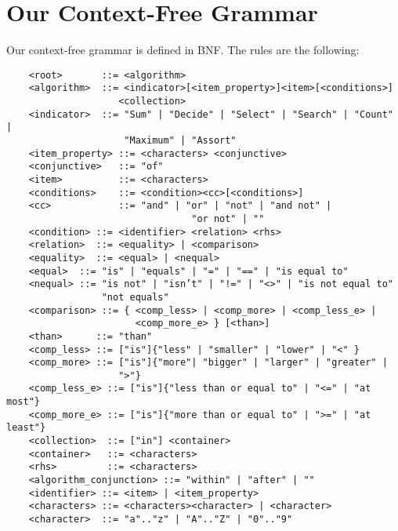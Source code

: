 \section{Our Context-Free Grammar}\label{app:bnf}

Our context-free grammar is defined in BNF. The rules are the following:
\begingroup \fontsize{9pt}{9pt}\selectfont

    \begin{verbatim}
    <root>       ::= <algorithm>
    <algorithm>  ::= <indicator>[<item_property>]<item>[<conditions>]
                    <collection>
    <indicator>  ::= "Sum" | "Decide" | "Select" | "Search" | "Count" |
                     "Maximum" | "Assort"
    <item_property> ::= <characters> <conjunctive>
    <conjunctive>   ::= "of"
    <item>          ::= <characters>
    <conditions>    ::= <condition><cc>[<conditions>]
    <cc>            ::= "and" | "or" | "not" | "and not" |
                                 "or not" | ""
    <condition> ::= <identifier> <relation> <rhs>
    <relation>  ::= <equality> | <comparison>
    <equality>  ::= <equal> | <nequal>
    <equal>  ::= "is" | "equals" | "=" | "==" | "is equal to"
    <nequal> ::= "is not" | "isn’t" | "!=" | "<>" | "is not equal to"
                 "not equals"
    <comparison> ::= { <comp_less> | <comp_more> | <comp_less_e> |
                       <comp_more_e> } [<than>]
    <than>      ::= "than"
    <comp_less> ::= ["is"]{"less" | "smaller" | "lower" | "<" }
    <comp_more> ::= ["is"]{"more"| "bigger" | "larger" | "greater" |
                    ">"}
    <comp_less_e> ::= ["is"]{"less than or equal to" | "<=" | "at most"}
    <comp_more_e> ::= ["is"]{"more than or equal to" | ">=" | "at least"}
    <collection>  ::= ["in"] <container>
    <container>   ::= <characters>
    <rhs>         ::= <characters>
    <algorithm_conjunction> ::= "within" | "after" | ""
    <identifier> ::= <item> | <item_property>
    <characters> ::= <characters><character> | <character>
    <character>  ::= "a".."z" | "A".."Z" | "0".."9"  
    \end{verbatim}  
\endgroup